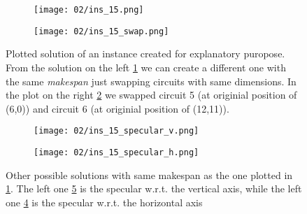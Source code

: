         \begin{figure}[H]
            \centering
            \begin{subfigure}[b]{0.45\textwidth}
                \centering 
                \texttt{[image: 02/ins\_15.png]}
                \caption{}
                \label{fig:ins_15_mod}
            \end{subfigure}
            \hfill
            \begin{subfigure}[b]{0.45\textwidth}
                \centering
                \texttt{[image: 02/ins\_15\_swap.png]}
                \caption{}
                \label{fig:ins_15_swap}
            \end{subfigure}
            \hfill
            \caption{
                Plotted solution of an instance created for explanatory puropose.
                From the solution on the left \ref{fig:ins_15_mod} we can create a different one
                with the same \textit{makespan} just swapping circuits with same dimensions. In
                the plot on the right \ref{fig:ins_15_swap} we swapped circuit 5 (at originial
                position of (6,0)) and circuit 6 (at originial position of (12,11)).
            }
            \label{fig:symmetry_swap}
        \end{figure}
       
        \begin{figure}[H]
            \centering
            \begin{subfigure}[b]{0.45\textwidth}
                \centering
                \texttt{[image: 02/ins\_15\_specular\_v.png]}
                \caption{}
                \label{fig:ins_15_specular_v}
            \end{subfigure}
            \hfill
            \begin{subfigure}[b]{0.45\textwidth}
                \centering 
                \texttt{[image: 02/ins\_15\_specular\_h.png]}
                \caption{}
                \label{fig:ins_15_specular_h}
            \end{subfigure}
            \hfill
            \caption{
                Other possible solutions with same makespan as the one plotted in \ref{fig:ins_15_mod}.
                The left one \ref{fig:ins_15_specular_h} is the specular w.r.t. the vertical axis,
                while the left one \ref{fig:ins_15_specular_v} is the specular w.r.t. the horizontal axis
            }
            \label{fig:symmetry_specular}
        \end{figure}

